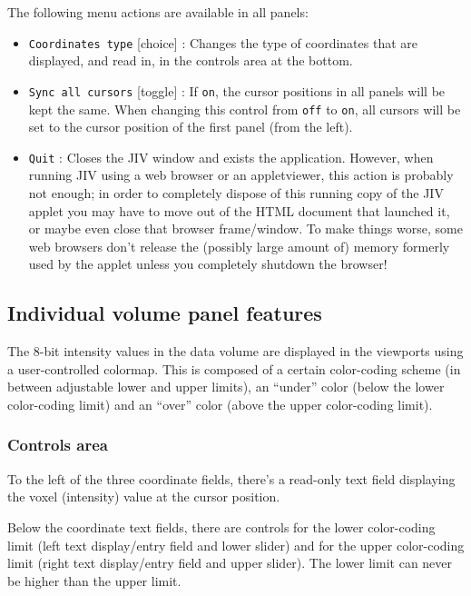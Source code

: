 The following menu actions are available in all panels:
\begin{itemize}
\item \verb+Coordinates type+ [choice] : Changes the type of
  coordinates that are displayed, and read in, in the controls area at
  the bottom.
\item \verb+Sync all cursors+ [toggle] : If \verb+on+, the cursor
  positions in all panels will be kept the same. When changing this
  control from \verb+off+ to \verb+on+, all cursors will be set to the
  cursor position of the first panel (from the left).
\item \verb+Quit+ : Closes the JIV window and exists the application.
  However, when running JIV using a web browser or an appletviewer,
  this action is probably not enough; in order to completely dispose
  of this running copy of the JIV applet you may have to move out of
  the HTML document that launched it, or maybe even close that browser
  frame/window. To make things worse, some web browsers don't release
  the (possibly large amount of) memory formerly used by the applet
  unless you completely shutdown the browser!
\end{itemize}

\subsection{Individual volume panel features}
\label{sec:individual-panel-features}
The 8-bit intensity values in the data volume are displayed in the
viewports using a user-controlled colormap.  This is composed of a
certain color-coding scheme (in between adjustable lower and upper
limits), an ``under'' color (below the lower color-coding limit) and
an ``over'' color (above the upper color-coding limit).

\subsubsection{Controls area}
To the left of the three coordinate fields, there's a read-only text
field displaying the voxel (intensity) value at the cursor position.

Below the coordinate text fields, there are controls for the lower
color-coding limit (left text display/entry field and lower slider)
and for the upper color-coding limit (right text display/entry field
and upper slider).  The lower limit can never be higher than the upper
limit. 

